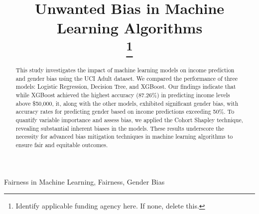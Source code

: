 \documentclass[conference]{IEEEtran}
\begin{document}
\pagestyle{plain}
\title{Unwanted Bias in Machine Learning Algorithms\\

\thanks{Identify applicable funding agency here. If none, delete this.}
}

\author{
\and
{}
\and
{}
    \and
}

\maketitle

\begin{abstract}
This study investigates the impact of machine learning models on income prediction and gender bias using the UCI Adult dataset. We compared the performance of three models: Logistic Regression, Decision Tree, and XGBoost. Our findings indicate that while XGBoost achieved the highest accuracy (87.26\%) in predicting income levels above \$50,000, it, along with the other models, exhibited significant gender bias, with accuracy rates for predicting gender based on income predictions exceeding 50\%. To quantify variable importance and assess bias, we applied the Cohort Shapley technique, revealing substantial inherent biases in the models. These results underscore the necessity for advanced bias mitigation techniques in machine learning algorithms to ensure fair and equitable outcomes.
\end{abstract}

\begin{IEEEkeywords}
Fairness in Machine Learning, Fairness, Gender Bias
\end{IEEEkeywords}
\end{document}
